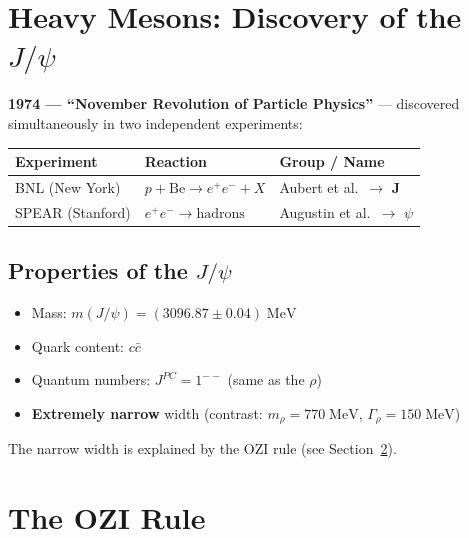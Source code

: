 \documentclass[11pt,a4paper]{article}
\newenvironment{notebox}{%
  \par\vspace{4pt}
  \noindent\small\color{notegray}%
}{\par\vspace{4pt}}
\begin{document}
\section{Heavy Mesons: Discovery of the \texorpdfstring{$J/\psi$}{J/psi}}

\textbf{1974 --- ``November Revolution of Particle Physics''} --- discovered simultaneously
in two independent experiments:

\vspace{6pt}
\begin{center}
\begin{tabular}{L{3.2cm} L{5cm} L{4cm}}
  \toprule
  \color{white}\textbf{Experiment} &
  \color{white}\textbf{Reaction} &
  \color{white}\textbf{Group / Name} \\
  \midrule
  BNL (New York)      & $p + \mathrm{Be} \to e^+e^- + X$   & Aubert et al.\ $\to$ \textbf{J} \\
  SPEAR (Stanford)    & $e^+e^- \to \mathrm{hadrons}$       & Augustin et al.\ $\to$ \textbf{$\psi$} \\
  \bottomrule
\end{tabular}
\end{center}
\vspace{6pt}

\subsection{Properties of the \texorpdfstring{$J/\psi$}{J/psi}}

\begin{itemize}
  \item Mass: $m(J/\psi) = (3096.87 \pm 0.04)\;\mathrm{MeV}$
  \item Quark content: $c\bar{c}$
  \item Quantum numbers: $J^{PC} = 1^{--}$ (same as the $\rho$)
  \item \textbf{Extremely narrow} width
        (contrast: $m_\rho = 770\;\mathrm{MeV}$, $\Gamma_\rho = 150\;\mathrm{MeV}$)
\end{itemize}

\begin{notebox}
  The narrow width is explained by the OZI rule (see Section~\ref{sec:ozi}).
\end{notebox}

\section{The OZI Rule}
\label{sec:ozi}
\end{document}
